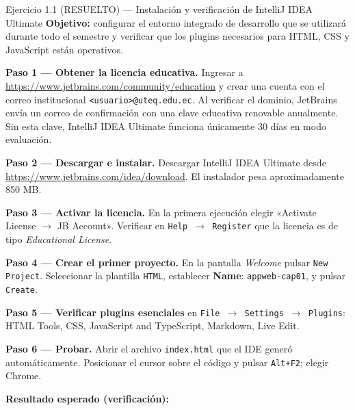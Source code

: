 \begin{cajaejercicio}{Ejercicio 1.1 (RESUELTO) --- Instalación y verificación de IntelliJ IDEA Ultimate}
\textbf{Objetivo:} configurar el entorno integrado de desarrollo que
se utilizará durante todo el semestre y verificar que los plugins
necesarios para HTML, CSS y JavaScript están operativos.

\textbf{Paso 1 --- Obtener la licencia educativa.} Ingresar a
\url{https://www.jetbrains.com/community/education} y crear una
cuenta con el correo institucional \texttt{<usuario>@uteq.edu.ec}. Al
verificar el dominio, JetBrains envía un correo de confirmación con
una clave educativa renovable anualmente. Sin esta clave, IntelliJ
IDEA Ultimate funciona únicamente 30 días en modo evaluación.

\textbf{Paso 2 --- Descargar e instalar.} Descargar IntelliJ IDEA
Ultimate desde \url{https://www.jetbrains.com/idea/download}. El
instalador pesa aproximadamente 850 MB.

\textbf{Paso 3 --- Activar la licencia.} En la primera ejecución
elegir «Activate License $\rightarrow$ JB Account». Verificar en
\texttt{Help $\rightarrow$ Register} que la licencia es de tipo
\emph{Educational License}.

\textbf{Paso 4 --- Crear el primer proyecto.} En la pantalla
\emph{Welcome} pulsar \texttt{New Project}. Seleccionar la plantilla
\texttt{HTML}, establecer \textbf{Name}: \texttt{appweb-cap01},
y pulsar \texttt{Create}.

\textbf{Paso 5 --- Verificar plugins esenciales} en
\texttt{File $\rightarrow$ Settings $\rightarrow$ Plugins}: HTML
Tools, CSS, JavaScript and TypeScript, Markdown, Live Edit.

\textbf{Paso 6 --- Probar.} Abrir el archivo \texttt{index.html} que
el IDE generó automáticamente. Posicionar el cursor sobre el código
y pulsar \texttt{Alt+F2}; elegir Chrome.

\textbf{Resultado esperado (verificación):}

\begin{center}
\end{center}


\end{cajaejercicio}
